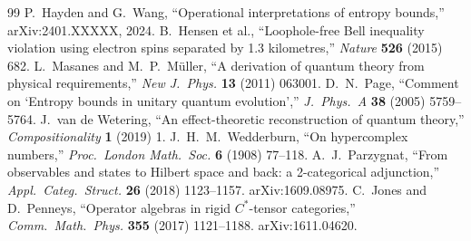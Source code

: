 \documentclass[11pt,a4paper]{article}
\theoremstyle{definition}
\begin{document}
\begin{thebibliography}{99}
 P.~Hayden and G.~Wang, ``Operational interpretations of entropy bounds,'' arXiv:2401.XXXXX, 2024.
 B.~Hensen et al., ``Loophole-free Bell inequality violation using electron spins separated by 1.3 kilometres,'' \textit{Nature} \textbf{526} (2015) 682.
 L.~Masanes and M.~P.~M\"uller, ``A derivation of quantum theory from physical requirements,'' \textit{New J.\ Phys.} \textbf{13} (2011) 063001.
 D.~N.~Page, ``Comment on `Entropy bounds in unitary quantum evolution','' \textit{J.\ Phys.\ A} \textbf{38} (2005) 5759--5764.
 J.~van de Wetering, ``An effect-theoretic reconstruction of quantum theory,'' \textit{Compositionality} \textbf{1} (2019) 1.
 J.~H.~M.~Wedderburn, ``On hypercomplex numbers,'' \textit{Proc.\ London Math.\ Soc.} \textbf{6} (1908) 77--118.
 A.~J.~Parzygnat, ``From observables and states to Hilbert space and back: a 2-categorical adjunction,'' \textit{Appl.\ Categ.\ Struct.} \textbf{26} (2018) 1123--1157.  arXiv:1609.08975.
 C.~Jones and D.~Penneys, ``Operator algebras in rigid $C^*$-tensor categories,'' \textit{Comm.\ Math.\ Phys.} \textbf{355} (2017) 1121--1188.  arXiv:1611.04620.
\end{thebibliography}
\end{document}
